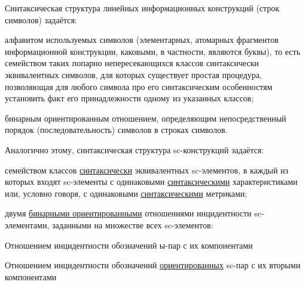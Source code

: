 Синтаксическая структура линейных информационных конструкций (строк символов) задаётся:
\begin{textitemize}
	\item алфавитом используемых символов (элементарных, атомарных фрагментов информационной конструкции, каковыми, в частности, являются буквы), то есть семейством таких попарно непересекающихся классов синтаксически эквивалентных символов, для которых существует простая процедура, позволяющая для любого символа про его синтаксическим особенностям установить факт его принадлежности одному из указанных классов;
	\item бинарным ориентированным отношением, определяющим непосредственный порядок (последовательность) символов в строках символов.
\end{textitemize}

Аналогично этому, синтаксическая структура sc-конструкций задаётся:
\begin{textitemize}
	\item семейством классов \underline{синтаксически} эквивалентных sc-элементов, в каждый из которых входят sc-элементы с одинаковыми \underline{синтаксическими} характеристиками или, условно говоря, с одинаковыми \underline{синтаксическими} метриками;
	\item двумя \underline{бинарными ориентированными} отношениями инцидентности sc-элементами, заданными на множестве всех sc-элементов:
	\begin{textitemize}
		\item Отношением инцидентности обозначений ы-пар с их компонентами
		\item Отношением инцидентности обозначений \underline{ориентированных} sc-пар с их вторыми компонентами\\
	\end{textitemize}
\end{textitemize}

